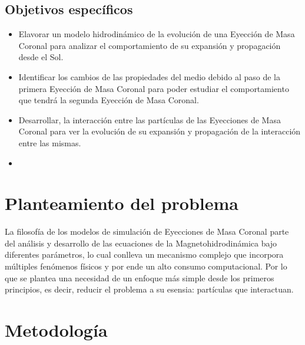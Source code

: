\subsection{Objetivos específicos}
\begin{itemize}
\item Elavorar un modelo hidrodinámico de la evolución de una Eyección de Masa Coronal para analizar el comportamiento de su expansión y propagación desde el Sol.
\item Identificar los cambios de las propiedades del medio debido al paso de la primera Eyección de Masa Coronal para poder estudiar el comportamiento que tendrá la segunda Eyección de Masa Coronal.
\item Desarrollar, la interacción entre las partículas de las Eyecciones de Masa Coronal para ver la evolución de su expansión y propagación de la interacción entre las mismas.
\item 
\end{itemize}



\section{Planteamiento del problema}
La filosofía de los modelos de simulación de Eyecciones de Masa Coronal parte del análisis y desarrollo de las ecuaciones de la Magnetohidrodinámica bajo diferentes parámetros, lo cual conlleva un mecanismo complejo que incorpora múltiples fenómenos físicos y por ende un alto consumo computacional. Por lo que se plantea una necesidad de un enfoque más simple desde los primeros principios, es decir, reducir el problema a su esensia: partículas que interactuan. 


\section{Metodología}
\printbibliography
